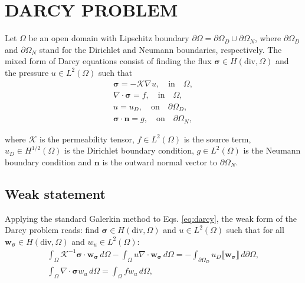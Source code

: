 \documentclass{wccm2024}
\begin{document}
\section{DARCY PROBLEM}

Let $\Omega$ be an open domain with Lipschitz boundary $\partial \Omega = \partial\Omega_D \cup \partial\Omega_N$, where $\partial\Omega_D$ and $\partial\Omega_N$ stand for the Dirichlet and Neumann boundaries, respectively. The mixed form of Darcy equations consist of finding the flux $\boldsymbol{\sigma} \in H(\text{div},\Omega)$ and the pressure $u \in L^2(\Omega)$ such that
\vskip -0.3cm
\begin{equation} \label{eq:darcy}
    \begin{split}
        \boldsymbol{\sigma}= -\mathcal{K}\nabla u, \quad \text{in} \quad \Omega, \\
        \nabla \cdot \boldsymbol{\sigma} = f, \quad \text{in} \quad \Omega, \\
        u = u_D, \quad \text{on} \quad \partial\Omega_D, \\
        \boldsymbol{\sigma} \cdot \boldsymbol{n} = g, \quad \text{on} \quad \partial\Omega_N,
    \end{split}
\end{equation}

\noindent where $\mathcal{K}$ is the permeability tensor, $f \in L^2(\Omega)$ is the source term, $u_D \in H^{1/2}(\Omega)$ is the Dirichlet boundary condition, $g \in L^2(\Omega)$ is the Neumann boundary condition and $\mathbf{n}$ is the outward normal vector to $\partial\Omega_N$.

\subsection{Weak statement}

Applying the standard Galerkin method to Eqs. \eqref{eq:darcy}, the weak form of the Darcy problem reads: find $\boldsymbol{\sigma} \in H(\text{div},\Omega)$ and $u \in L^2(\Omega)$ such that for all $\mathbf{w}_{\boldsymbol{\sigma}} \in H(\text{div},\Omega)$ and $w_u \in L^2(\Omega)$:
\vskip -0.3cm
\begin{equation} \label{eq:weak}
    \begin{split}
        \int_{\Omega} \mathcal{K}^{-1}\boldsymbol{\sigma} \cdot \mathbf{w}_{\boldsymbol{\sigma}} \, d\Omega - \int_{\Omega} u \nabla \cdot \mathbf{w}_{\boldsymbol{\sigma}} \, d\Omega = - \int_{\partial\Omega_D} u_D \llbracket \mathbf{w}_{\boldsymbol{\sigma}} \rrbracket \, d\partial\Omega, \\
        \int_{\Omega} \nabla \cdot \boldsymbol{\sigma} w_u \, d\Omega = \int_{\Omega} f w_u \, d\Omega,
    \end{split}
\end{equation}
\end{document}
